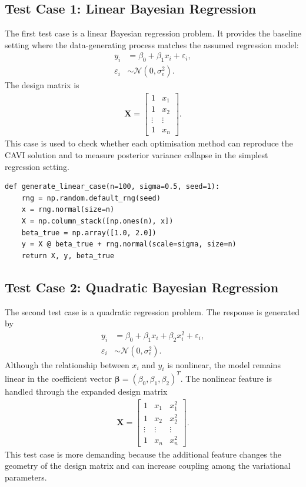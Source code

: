 \documentclass[11pt,a4paper]{article}
\newcommand{\N}{\mathcal{N}}
\begin{document}
\subsection{Test Case 1: Linear Bayesian Regression}

The first test case is a linear Bayesian regression problem. It provides the baseline setting where the data-generating process matches the assumed regression model:
\begin{align}
y_i &= \beta_0 + \beta_1 x_i + \varepsilon_i,\\
\varepsilon_i &\sim \N(0,\sigma_e^2).
\end{align}
The design matrix is
\begin{align}
\bm{X} =
\begin{bmatrix}
1 & x_1\\
1 & x_2\\
\vdots & \vdots\\
1 & x_n
\end{bmatrix}.
\end{align}
This case is used to check whether each optimisation method can reproduce the CAVI solution and to measure posterior variance collapse in the simplest regression setting.

\begin{verbatim}
def generate_linear_case(n=100, sigma=0.5, seed=1):
    rng = np.random.default_rng(seed)
    x = rng.normal(size=n)
    X = np.column_stack([np.ones(n), x])
    beta_true = np.array([1.0, 2.0])
    y = X @ beta_true + rng.normal(scale=sigma, size=n)
    return X, y, beta_true
\end{verbatim}

\subsection{Test Case 2: Quadratic Bayesian Regression}

The second test case is a quadratic regression problem. The response is generated by
\begin{align}
y_i &= \beta_0 + \beta_1 x_i + \beta_2 x_i^2 + \varepsilon_i,\\
\varepsilon_i &\sim \N(0,\sigma_e^2).
\end{align}
Although the relationship between $x_i$ and $y_i$ is nonlinear, the model remains linear in the coefficient vector $\bm{\beta}=(\beta_0,\beta_1,\beta_2)^T$. The nonlinear feature is handled through the expanded design matrix
\begin{align}
\bm{X} =
\begin{bmatrix}
1 & x_1 & x_1^2\\
1 & x_2 & x_2^2\\
\vdots & \vdots & \vdots\\
1 & x_n & x_n^2
\end{bmatrix}.
\end{align}
This test case is more demanding because the additional feature changes the geometry of the design matrix and can increase coupling among the variational parameters.
\end{document}
